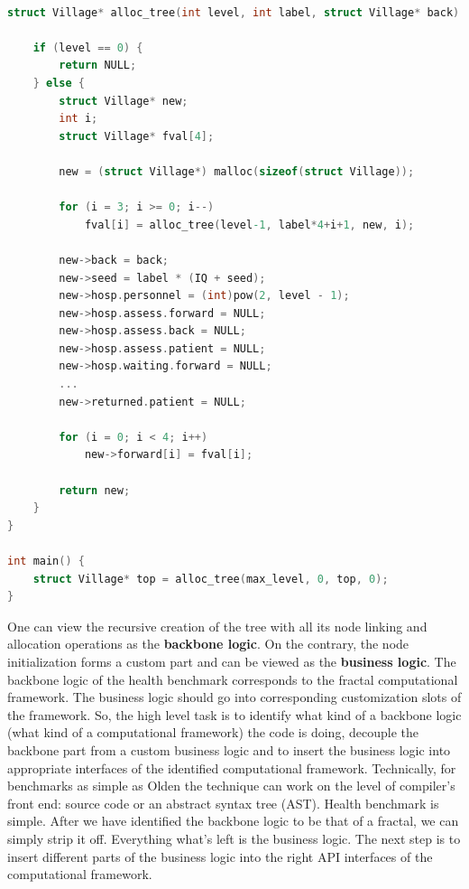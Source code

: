 \begin{minipage}[t]{\linewidth}
\begin{lstlisting}[caption={Computational framework class template skeleton},label={lst:future_work_original},language=C]

struct Village* alloc_tree(int level, int label, struct Village* back) {
    
    if (level == 0) {
        return NULL;
    } else {
        struct Village* new;
        int i;
        struct Village* fval[4];

        new = (struct Village*) malloc(sizeof(struct Village));

        for (i = 3; i >= 0; i--)
            fval[i] = alloc_tree(level-1, label*4+i+1, new, i);

        new->back = back;
        new->seed = label * (IQ + seed); 
        new->hosp.personnel = (int)pow(2, level - 1);
        new->hosp.assess.forward = NULL;
        new->hosp.assess.back = NULL;
        new->hosp.assess.patient = NULL;
        new->hosp.waiting.forward = NULL;
        ...
        new->returned.patient = NULL;

        for (i = 0; i < 4; i++)
            new->forward[i] = fval[i];

        return new;
    }
}

int main() {
    struct Village* top = alloc_tree(max_level, 0, top, 0);
}
\end{lstlisting}
\end{minipage}

\quad One can view the recursive creation of the tree with all its node linking and allocation operations as the \textbf{backbone logic}. On the contrary, the node initialization forms a custom part and can be viewed as the \textbf{business logic}. The backbone logic of the health benchmark corresponds to the fractal computational framework. The business logic should go into corresponding customization slots of the framework. So, the high level task is to identify what kind of a backbone logic (what kind of a computational framework) the code is doing, decouple the backbone part from a custom business logic and to insert the business logic into appropriate interfaces of the identified computational framework. Technically, for benchmarks as simple as Olden the technique can work on the level of compiler's front end: source code or an abstract syntax tree (AST). Health benchmark is simple. After we have identified the backbone logic to be that of a fractal, we can simply strip it off. Everything what's left is the business logic. The next step is to insert different parts of the business logic into the right API interfaces of the computational framework. 

